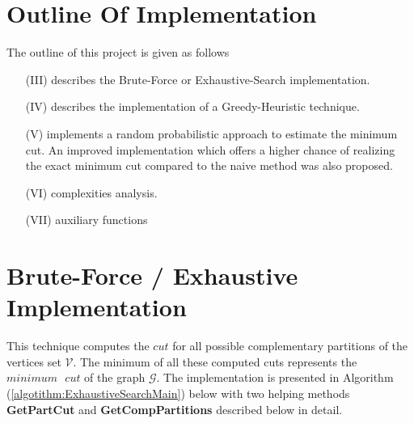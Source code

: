 \documentclass[longpaper, english, final, times]{revdetua}
\begin{document}
	\section{Outline Of Implementation}
		The outline of this project is given as follows
		\begin{enumerate}[label=(\arabic*)]
			\item[(III)] describes the Brute-Force or Exhaustive-Search implementation.
			\item[(IV)] describes the implementation of a Greedy-Heuristic technique.
			\item[(V)] implements a random probabilistic approach to estimate the minimum cut. An improved implementation which offers a higher chance of realizing the exact minimum cut compared to the naive method was also proposed.
			\item[(VI)] complexities analysis.
			\item[(VII)] auxiliary functions 
		\end{enumerate}
	 	
	 \section{Brute-Force / Exhaustive Implementation}
		This technique computes the $cut$ for all possible complementary partitions of the vertices set $\mathcal{V}$. The minimum of all these computed cuts represents the $minimum \text{ } cut$ of the graph $\mathcal{G}$. The implementation is presented in Algorithm (\ref{algotithm:ExhaustiveSearchMain}) below with two helping methods \textbf{GetPartCut} and \textbf{GetCompPartitions} described below in detail.
		
\end{document}
